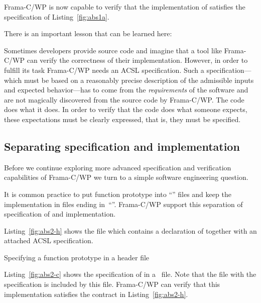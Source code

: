 Frama-C\slash WP is now capable to verify that the implementation of
 satisfies the specification of Listing~\ref{fig:abs1a}.

There is an important lesson that can be learned here:

\begin{framed}
\label{lesson}
Sometimes developers provide source code and imagine that a tool
like Frama-C\slash WP can verify the correctness of their implementation.
However, in order to fulfill its task Frama-C\slash WP needs an ACSL specification. 
Such a specification---which must be based on a reasonably precise description of the
admissible inputs and expected behavior---has to come from the \emph{requirements}
of the software and are not magically discovered from the source code by Frama-C\slash WP.
The code does what it does. 
In order to verify that the code does what someone expects, these expectations
must be clearly expressed, that is, they must be specified.
\end{framed}

\clearpage

\subsection{Separating specification and implementation}

Before we continue exploring more advanced specification and verification
capabilities of Frama-C\slash WP we turn to a simple software engineering question.

It is common practice to put function prototype into ``'' files and
keep the implementation in files ending in~``''.
Frama-C\slash WP support this separation of specification of and implementation.

Listing~\ref{fig:abs2-h} shows the file  which contains
a declaration of  together with an attached ACSL specification.

\begin{listing}[hbt]
\begin{minipage}{\textwidth}

\end{minipage}
\caption{\label{fig:abs2-h} Specifying a function prototype in a header file}
\end{listing}

Listing~\ref{fig:abs2-c} shows the specification of  in a~ file.
Note that the file  with the specification is included by this file.
Frama-C\slash WP can verify that this implementation satisfies the contract in
Listing~\ref{fig:abs2-h}.



